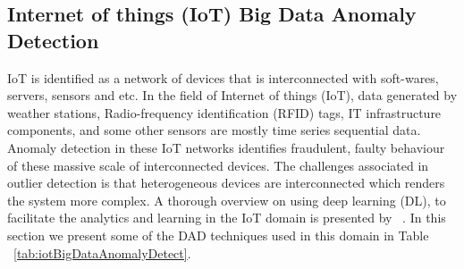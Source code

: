 \subsection{Internet of things (IoT) Big Data Anomaly Detection}

IoT is identified as a network of  devices that is interconnected with soft-wares, servers, sensors and etc. In the field of Internet of things (IoT), data generated by weather stations, Radio-frequency identification (RFID) tags, IT infrastructure
components, and some other sensors are mostly time series sequential data. Anomaly detection in these IoT networks identifies fraudulent, faulty behaviour of these massive scale of interconnected devices. The challenges associated  in outlier detection is that heterogeneous devices are interconnected which renders the system more complex. A thorough overview on using  deep learning (DL), to facilitate the analytics and learning in the IoT domain is presented by ~\cite{mohammadi2018deep}. In this section we present some of the DAD techniques used in this domain in Table ~\ref{tab:iotBigDataAnomalyDetect}.

\begin{table*}
\begin{center}
\caption{Examples of DAD techniques used in Internet of things (IoT) Big Data Anomaly Detection.
        \\ AE: Autoencoders, LSTM : Long Short Term Memory Networks
        \\ DBN : Deep Belief Networks.}
 \captionsetup{justification=centering}
  \label{tab:iotBigDataAnomalyDetect}
\end{center}
\end{table*}





